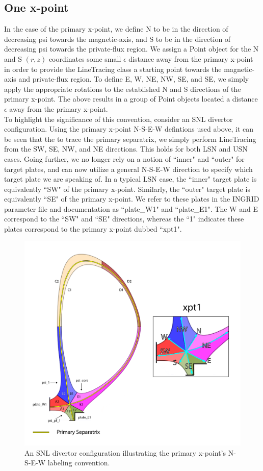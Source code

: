 \subsection{\label{sec:level2}One x-point}
In the case of the primary x-point, we define N to be in the direction of decreasing psi towards the magnetic-axis, and S to be in the direction of decreasing psi towards the private-flux region. We assign a Point object for the N and S $(r,z)$ coordinates some small $\epsilon$ distance away from the primary x-point in order to provide the LineTracing class a starting point towards the magnetic-axis and private-flux region. To define E, W, NE, NW, SE, and SE, we simply apply the appropriate rotations to the established N and S directions of the primary x-point. The above results in a group of Point objects located a distance $\epsilon$ away from the primary x-point.\\ \indent
To highlight the significance of this convention, consider an SNL divertor configuration. Using the primary x-point N-S-E-W defintions used above, it can be seen that the to trace the primary separatrix, we simply perform LineTracing from the SW, SE, NW, and NE directions. This holds for both LSN and USN cases. Going further, we no longer rely on a notion of ``inner" and ``outer" for target plates, and can now utilize a general N-S-E-W direction to specify which target plate we are speaking of. In a typical LSN case, the ``inner" target plate is equivalently ``SW" of the primary x-point. Similarly, the ``outer" target plate is equivalently ``SE" of the primary x-point. We refer to these plates in the INGRID parameter file and documentation as ``plate\_W1" and ``plate\_E1". The W and E correspond to the ``SW" and ``SE" directions, whereas the ``1" indicates these plates correspond to the primary x-point dubbed ``xpt1".
\begin{figure}[H]
    \centering
    \includegraphics[width=\linewidth]{figures/xpt_1_directions.pdf}
    \caption{An SNL divertor configuration illustrating the primary x-point's N-S-E-W labeling convention.}
    \label{fig:xpt_1_directions}
\end{figure}